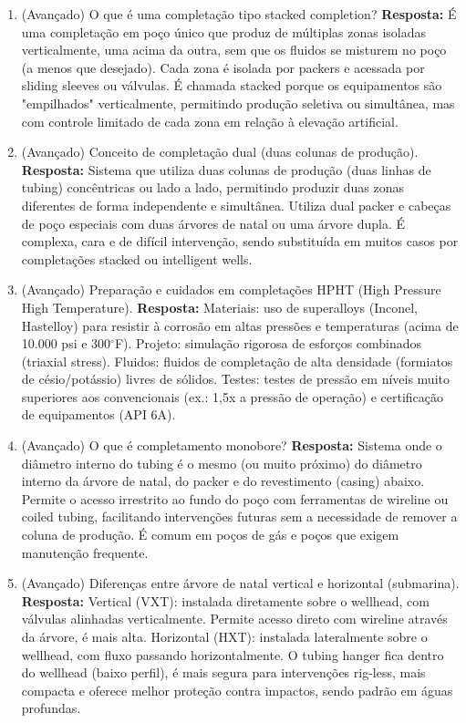 \documentclass[11pt,a4paper]{article}
\begin{document}
\begin{enumerate}
  \item (Avançado) O que é uma completação tipo stacked completion?
  \textbf{Resposta:} É uma completação em poço único que produz de múltiplas zonas isoladas verticalmente, uma acima da outra, sem que os fluidos se misturem no poço (a menos que desejado). Cada zona é isolada por packers e acessada por sliding sleeves ou válvulas. É chamada stacked porque os equipamentos são "empilhados" verticalmente, permitindo produção seletiva ou simultânea, mas com controle limitado de cada zona em relação à elevação artificial.

  \item (Avançado) Conceito de completação dual (duas colunas de produção).
  \textbf{Resposta:} Sistema que utiliza duas colunas de produção (duas linhas de tubing) concêntricas ou lado a lado, permitindo produzir duas zonas diferentes de forma independente e simultânea. Utiliza dual packer e cabeças de poço especiais com duas árvores de natal ou uma árvore dupla. É complexa, cara e de difícil intervenção, sendo substituída em muitos casos por completações stacked ou intelligent wells.

  \item (Avançado) Preparação e cuidados em completações HPHT (High Pressure High Temperature).
  \textbf{Resposta:} Materiais: uso de superalloys (Inconel, Hastelloy) para resistir à corrosão em altas pressões e temperaturas (acima de 10.000 psi e 300$^\circ$F). Projeto: simulação rigorosa de esforços combinados (triaxial stress). Fluidos: fluidos de completação de alta densidade (formiatos de césio/potássio) livres de sólidos. Testes: testes de pressão em níveis muito superiores aos convencionais (ex.: 1,5x a pressão de operação) e certificação de equipamentos (API 6A).

  \item (Avançado) O que é completamento monobore?
  \textbf{Resposta:} Sistema onde o diâmetro interno do tubing é o mesmo (ou muito próximo) do diâmetro interno da árvore de natal, do packer e do revestimento (casing) abaixo. Permite o acesso irrestrito ao fundo do poço com ferramentas de wireline ou coiled tubing, facilitando intervenções futuras sem a necessidade de remover a coluna de produção. É comum em poços de gás e poços que exigem manutenção frequente.

  \item (Avançado) Diferenças entre árvore de natal vertical e horizontal (submarina).
  \textbf{Resposta:} Vertical (VXT): instalada diretamente sobre o wellhead, com válvulas alinhadas verticalmente. Permite acesso direto com wireline através da árvore, é mais alta. Horizontal (HXT): instalada lateralmente sobre o wellhead, com fluxo passando horizontalmente. O tubing hanger fica dentro do wellhead (baixo perfil), é mais segura para intervenções rig-less, mais compacta e oferece melhor proteção contra impactos, sendo padrão em águas profundas.


\end{enumerate}
\end{document}
